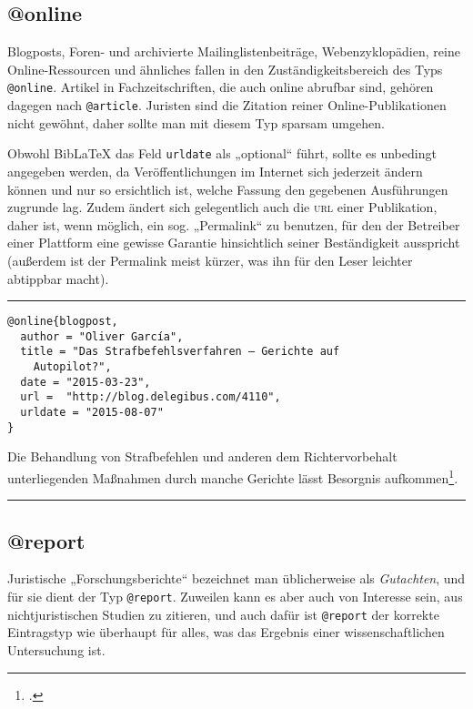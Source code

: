\documentclass[11pt,a4paper,DIV=calc]{scrartcl}
\newcommand\software[1]{\textsf{#1}}
\newcommand\Biblatex{\software{Bib\LaTeX{}}\xspace}
\newcommand\abbrev[1]{\textsc{#1}}
\newenvironment{rubexample}{\par\vspace{\baselineskip}\hrule\par\begin{refsection}}{\end{refsection}\par\hrule\par\vspace{\baselineskip}}
\begin{document}
\subsection{@online}

Blogposts, Foren- und archivierte Mailinglistenbeiträge,
Webenzyklopädien, reine On\-line-Res\-sour\-cen und ähnliches fallen
in den Zuständigkeitsbereich des Typs \verb+@online+. Artikel in
Fachzeitschriften, die auch online abrufbar sind, gehören dagegen nach
\verb+@article+. Juristen sind die Zitation reiner
On\-line-Pu\-bli\-ka\-tio\-nen nicht gewöhnt, daher sollte man mit
diesem Typ sparsam umgehen.

Obwohl \Biblatex das Feld \verb+urldate+ als „optional“ führt, sollte
es unbedingt angegeben werden, da Veröffentlichungen im Internet sich
jederzeit ändern können und nur so ersichtlich ist, welche Fassung den
gegebenen Ausführungen zugrunde lag. Zudem ändert sich gelegentlich
auch die \abbrev{url} einer Publikation, daher ist, wenn möglich, ein
sog. „Permalink“ zu benutzen, für den der Betreiber einer Plattform
eine gewisse Garantie hinsichtlich seiner Beständigkeit ausspricht
(außerdem ist der Permalink meist kürzer, was ihn für den Leser
leichter abtippbar macht).

\begin{rubexample}
\begin{verbatim}
@online{blogpost,
  author = "Oliver García",
  title = "Das Strafbefehlsverfahren — Gerichte auf
    Autopilot?",
  date = "2015-03-23",
  url =  "http://blog.delegibus.com/4110",
  urldate = "2015-08-07"
}
\end{verbatim}

Die Behandlung von Strafbefehlen und anderen dem Richtervorbehalt
unterliegenden Maßnahmen durch manche Gerichte lässt Besorgnis
aufkommen\footcite{blogpost}.

\printbibliography
\end{rubexample}

\subsection{@report}

Juristische „Forschungsberichte“ bezeichnet man üblicherweise als
\emph{Gutachten}, und für sie dient der Typ \verb+@report+. Zuweilen
kann es aber auch von Interesse sein, aus nichtjuristischen Studien zu
zitieren, und auch dafür ist \verb+@report+ der korrekte Eintragstyp
wie überhaupt für alles, was das Ergebnis einer wissenschaftlichen
Untersuchung ist.
\end{document}
